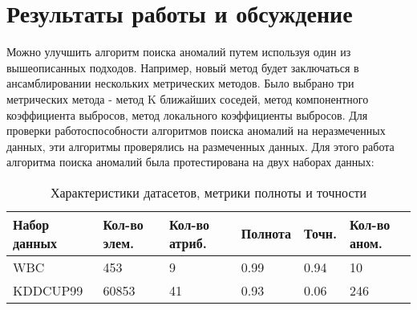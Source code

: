 \section{Результаты работы и обсуждение}
Можно улучшить алгоритм поиска аномалий путем используя один из вышеописанных подходов.
Например, новый метод будет заключаться в ансамблировании нескольких метрических методов. Было выбрано три метрических метода - метод K ближайших соседей, метод компонентного коэффициента выбросов, метод локального коэффициенты выбросов\cite{Book13}.
Для проверки работоспособности алгоритмов поиска аномалий на неразмеченных данных, эти алгоритмы проверялись на размеченных данных.
Для этого работа алгоритма поиска аномалий была протестирована на двух наборах данных\cite{datasets}:
\begin{table}[!h]
	
	\caption{\label{tab:issled1}Характеристики датасетов, метрики полноты и точности}
	
	\begin{center}
		
		\begin{tabular}{|l|l|l|l|l|l|}
			
			\hline
			
			Набор данных& Кол-во элем. & Кол-во атриб. &  Полнота & Точн.& Кол-во аном.  \\
			
			\hline 
			
			WBC& 453 & 9 & 0.99&0.94 & 10  \\
			
			\hline
			KDDCUP99 & 60853 & 41 & 0.93&0.06 & 246  \\
			\hline
			
			
		\end{tabular}
		
	\end{center}
	
\end{table}

